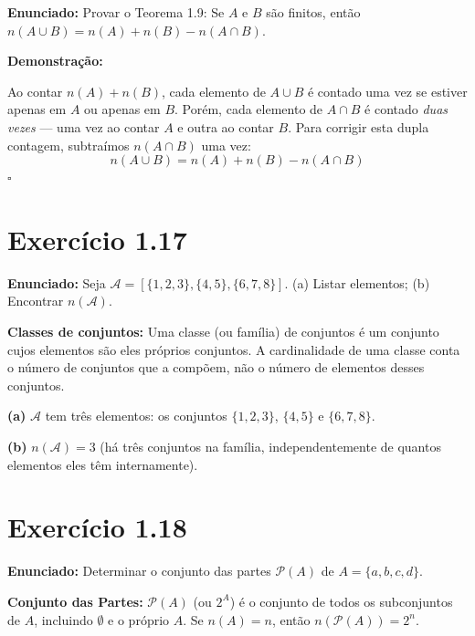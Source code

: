 \documentclass[12pt,a4paper]{article}
\begin{document}
\textbf{Enunciado:} Provar o Teorema 1.9: Se $A$ e $B$ são finitos, então $n(A \cup B) = n(A) + n(B) - n(A \cap B)$.

\textbf{Demonstração:}

Ao contar $n(A) + n(B)$, cada elemento de $A \cup B$ é contado uma vez se estiver apenas em $A$ ou apenas em $B$. Porém, cada elemento de $A \cap B$ é contado \emph{duas vezes} --- uma vez ao contar $A$ e outra ao contar $B$. Para corrigir esta dupla contagem, subtraímos $n(A \cap B)$ uma vez:
\[
n(A \cup B) = n(A) + n(B) - n(A \cap B)
\]
\hfill$\square$

\section*{Exercício 1.17}

\textbf{Enunciado:} Seja $\mathcal{A} = [\{1,2,3\}, \{4,5\}, \{6,7,8\}]$. (a) Listar elementos; (b) Encontrar $n(\mathcal{A})$.

\begin{teoribox}
\textbf{Classes de conjuntos:} Uma classe (ou família) de conjuntos é um conjunto cujos elementos são eles próprios conjuntos. A cardinalidade de uma classe conta o número de conjuntos que a compõem, não o número de elementos desses conjuntos.
\end{teoribox}

\textbf{(a)} $\mathcal{A}$ tem três elementos: os conjuntos $\{1,2,3\}$, $\{4,5\}$ e $\{6,7,8\}$.

\textbf{(b)} $n(\mathcal{A}) = 3$ (há três conjuntos na família, independentemente de quantos elementos eles têm internamente).

\section*{Exercício 1.18}

\textbf{Enunciado:} Determinar o conjunto das partes $\mathcal{P}(A)$ de $A = \{a,b,c,d\}$.

\begin{teoribox}
\textbf{Conjunto das Partes:} $\mathcal{P}(A)$ (ou $2^A$) é o conjunto de todos os subconjuntos de $A$, incluindo $\emptyset$ e o próprio $A$. Se $n(A) = n$, então $n(\mathcal{P}(A)) = 2^n$.
\end{teoribox}
\end{document}
